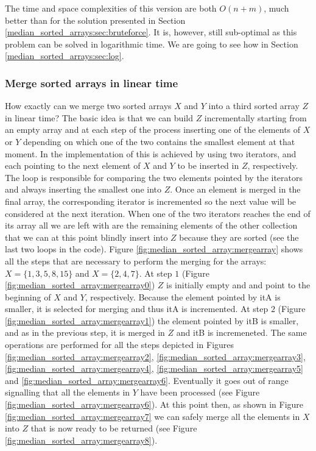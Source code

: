 

The time and space complexities of this version are both $O(n+m)$, much better than for the solution presented in
Section \ref{median_sorted_arrays:sec:bruteforce}. It is, however,  still sub-optimal as this problem can be
solved in logarithmic time. We are going to see how in Section \ref{median_sorted_arrays:sec:log}.

\subsubsection{Merge sorted arrays in linear time}
How exactly can we merge two sorted arrays $X$ and $Y$ into a third sorted array $Z$ in linear time? 
The basic idea is that we can build $Z$ incrementally starting from an empty array and at each step of the process
inserting one of the elements of $X$ or $Y$ depending on which one of the two contains the smallest element at that moment.
In the implementation of  this is achieved by using two iterators,  and  
each pointing to the next element of $X$ and $Y$ to be inserted in $Z$, respectively.
The  loop is responsible for comparing the two elements pointed by the iterators and always inserting the smallest one
into $Z$.  Once an element is merged in the final array, the corresponding iterator is incremented so the next value will be considered at the next iteration.
When one of the two iterators reaches the end of its array all we are left with are the remaining elements of the other collection that we can at this point blindly insert into $Z$ because they are sorted 
(see the last two  loops in the code).
Figure \ref{fig:median_sorted_array:mergearray} shows all the steps that are necessary to perform the merging for the arrays:
$X = \{1,3,5,8,15\}$ and $X = \{2,4,7\}$. At step $1$ (Figure \ref{fig:median_sorted_array:mergearray0}) $Z$ is initially empty and  and  point to the beginning of $X$ and $Y$, respectively.
Because the element pointed by itA is smaller, it is selected for merging and thus itA is incremented.
At step $2$ (Figure \ref{fig:median_sorted_array:mergearray1}) the element pointed by itB is smaller, and as in the previous step, it is merged in $Z$ and itB is incremeneted.
The same operations are performed for all the steps depicted in Figures 
\ref{fig:median_sorted_array:mergearray2},
\ref{fig:median_sorted_array:mergearray3},
\ref{fig:median_sorted_array:mergearray4},
\ref{fig:median_sorted_array:mergearray5} and \ref{fig:median_sorted_array:mergearray6}.
Eventually it goes out of range signalling that all the elements in $Y$ have been processed (see Figure \ref{fig:median_sorted_array:mergearray6}).
At this point then, as shown in Figure \ref{fig:median_sorted_array:mergearray7} we can safely merge all the elements in $X$ into $Z$ that is now ready to be returned (see Figure \ref{fig:median_sorted_array:mergearray8}).

